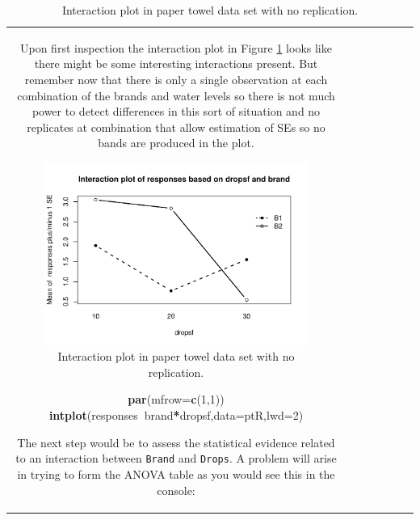 \documentclass[]{book}
\newenvironment{Shaded}{\begin{snugshade}}{\end{snugshade}}
\newcommand{\KeywordTok}[1]{\textcolor[rgb]{0.13,0.29,0.53}{\textbf{#1}}}
\newcommand{\DataTypeTok}[1]{\textcolor[rgb]{0.13,0.29,0.53}{#1}}
\newcommand{\DecValTok}[1]{\textcolor[rgb]{0.00,0.00,0.81}{#1}}
\newcommand{\OperatorTok}[1]{\textcolor[rgb]{0.81,0.36,0.00}{\textbf{#1}}}
\newcommand{\NormalTok}[1]{#1}
\theoremstyle{definition}
\theoremstyle{definition}
\theoremstyle{remark}
\begin{document}
\begin{longtable}[]{@{}ccccccc@{}}
\begin{minipage}[b]{0.10\columnwidth}
\begin{Shaded}
\begin{Highlighting}[]
\begin{Shaded}
\begin{Highlighting}[]
\begin{Shaded}
\begin{Highlighting}[]
\begin{Shaded}
\begin{Highlighting}[]
\begin{Shaded}
\begin{Highlighting}[]
\begin{Shaded}
\begin{Highlighting}[]
\begin{Shaded}
\begin{Highlighting}[]
Upon first inspection the interaction plot in Figure
\ref{fig:Figure4-17} looks like there might be some interesting
interactions present. But remember now that there is only a single
observation at each combination of the brands and water levels so there
is not much power to detect differences in this sort of situation and no
replicates at combination that allow estimation of SEs so no bands are
produced in the plot.




\begin{figure}
\centering
\includegraphics{04-twoWayAnova_files/figure-latex/Figure4-17-1.pdf}
\caption{\label{fig:Figure4-17}Interaction plot in paper towel data set with no
replication.}
\end{figure}

\begin{Shaded}
\begin{Highlighting}[]
\KeywordTok{par}\NormalTok{(}\DataTypeTok{mfrow=}\KeywordTok{c}\NormalTok{(}\DecValTok{1}\NormalTok{,}\DecValTok{1}\NormalTok{))}
\KeywordTok{intplot}\NormalTok{(responses}\OperatorTok{~}\NormalTok{brand}\OperatorTok{*}\NormalTok{dropsf,}\DataTypeTok{data=}\NormalTok{ptR,}\DataTypeTok{lwd=}\DecValTok{2}\NormalTok{)}
\end{Highlighting}
\end{Shaded}

The next step would be to assess the statistical evidence related to an
interaction between \texttt{Brand} and \texttt{Drops}. A problem will
arise in trying to form the ANOVA table as you would see this in the
console:

\small


\end{Highlighting}
\end{Shaded}
\end{Highlighting}
\end{Shaded}
\end{Highlighting}
\end{Shaded}
\end{Highlighting}
\end{Shaded}
\end{Highlighting}
\end{Shaded}
\end{Highlighting}
\end{Shaded}
\end{Highlighting}
\end{Shaded}
\end{minipage}
\end{longtable}
\end{document}
